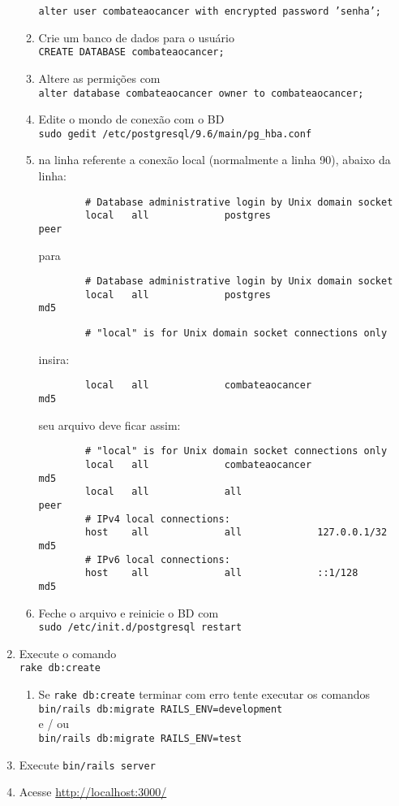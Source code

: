 \documentclass[12pt,a4paper]{article}
\begin{document}
\begin{enumerate}
\begin{enumerate}
		\texttt{alter user combateaocancer with encrypted password 'senha';}
		\item Crie um banco de dados para o usuário \\
		\texttt{CREATE DATABASE combateaocancer;}
		\item Altere as permições com\\
		\texttt{alter database combateaocancer owner to combateaocancer;}
		\item Edite o mondo de conexão com o BD\\
		\texttt{sudo gedit /etc/postgresql/9.6/main/pg\_hba.conf}
		\item na linha referente a conexão local (normalmente a linha 90), abaixo da linha:
		\begin{verbatim}
		# Database administrative login by Unix domain socket
		local   all             postgres                           peer
		\end{verbatim}
		para
		\begin{verbatim}
		# Database administrative login by Unix domain socket
		local   all             postgres                           md5
		\end{verbatim}
		\begin{verbatim}
		# "local" is for Unix domain socket connections only
		\end{verbatim}
		insira:
		\begin{verbatim}
		local   all             combateaocancer                    md5
		\end{verbatim}
		seu arquivo deve ficar assim:
		\begin{verbatim}
		# "local" is for Unix domain socket connections only
		local   all             combateaocancer                    md5
		local   all             all                                peer
		# IPv4 local connections:
		host    all             all             127.0.0.1/32       md5
		# IPv6 local connections:
		host    all             all             ::1/128            md5
		\end{verbatim}
		\item Feche o arquivo e reinicie o BD com \\
		\texttt{sudo /etc/init.d/postgresql restart}
	\end{enumerate}
	\item Execute o comando\\
	\texttt{rake db:create}
	\begin{enumerate}
		\item Se \texttt{rake db:create} terminar com erro tente executar os comandos\\
		\texttt{bin/rails db:migrate RAILS\_ENV=development}\\
		e / ou\\
		\texttt{bin/rails db:migrate RAILS\_ENV=test}
	\end{enumerate}
	\item Execute \texttt{bin/rails server}
	\item Acesse \url{http://localhost:3000/}
\end{enumerate}
\end{document}
